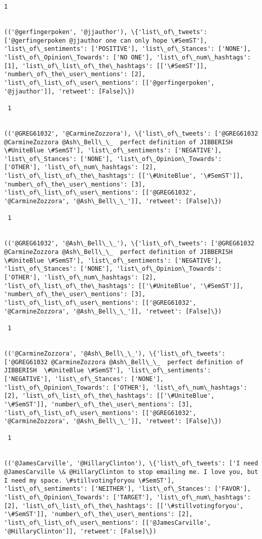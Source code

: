 \documentclass[11pt]{article}
\begin{document}
\begin{Verbatim}[commandchars=\\\{\}]
 1
 

(('@gerfingerpoken', '@jjauthor'), \{'list\_of\_tweets': ['@gerfingerpoken @jjauthor one can only hope \#SemST'], 'list\_of\_sentiments': ['POSITIVE'], 'list\_of\_Stances': ['NONE'], 'list\_of\_Opinion\_Towards': ['NO ONE'], 'list\_of\_num\_hashtags': [1], 'list\_of\_list\_of\_the\_hashtags': [['\#SemST']], 'number\_of\_the\_user\_mentions': [2], 'list\_of\_list\_of\_user\_mentions': [['@gerfingerpoken', '@jjauthor']], 'retweet': [False]\})

 1
 

(('@GREG61032', '@CarmineZozzora'), \{'list\_of\_tweets': ['@GREG61032 @CarmineZozzora @Ash\_Bell\_\_  perfect definition of JIBBERISH  \#UniteBlue \#SemST'], 'list\_of\_sentiments': ['NEGATIVE'], 'list\_of\_Stances': ['NONE'], 'list\_of\_Opinion\_Towards': ['OTHER'], 'list\_of\_num\_hashtags': [2], 'list\_of\_list\_of\_the\_hashtags': [['\#UniteBlue', '\#SemST']], 'number\_of\_the\_user\_mentions': [3], 'list\_of\_list\_of\_user\_mentions': [['@GREG61032', '@CarmineZozzora', '@Ash\_Bell\_\_']], 'retweet': [False]\})

 1
 

(('@GREG61032', '@Ash\_Bell\_\_'), \{'list\_of\_tweets': ['@GREG61032 @CarmineZozzora @Ash\_Bell\_\_  perfect definition of JIBBERISH  \#UniteBlue \#SemST'], 'list\_of\_sentiments': ['NEGATIVE'], 'list\_of\_Stances': ['NONE'], 'list\_of\_Opinion\_Towards': ['OTHER'], 'list\_of\_num\_hashtags': [2], 'list\_of\_list\_of\_the\_hashtags': [['\#UniteBlue', '\#SemST']], 'number\_of\_the\_user\_mentions': [3], 'list\_of\_list\_of\_user\_mentions': [['@GREG61032', '@CarmineZozzora', '@Ash\_Bell\_\_']], 'retweet': [False]\})

 1
 

(('@CarmineZozzora', '@Ash\_Bell\_\_'), \{'list\_of\_tweets': ['@GREG61032 @CarmineZozzora @Ash\_Bell\_\_  perfect definition of JIBBERISH  \#UniteBlue \#SemST'], 'list\_of\_sentiments': ['NEGATIVE'], 'list\_of\_Stances': ['NONE'], 'list\_of\_Opinion\_Towards': ['OTHER'], 'list\_of\_num\_hashtags': [2], 'list\_of\_list\_of\_the\_hashtags': [['\#UniteBlue', '\#SemST']], 'number\_of\_the\_user\_mentions': [3], 'list\_of\_list\_of\_user\_mentions': [['@GREG61032', '@CarmineZozzora', '@Ash\_Bell\_\_']], 'retweet': [False]\})

 1
 

(('@JamesCarville', '@HillaryClinton'), \{'list\_of\_tweets': ['I need @JamesCarville \& @HillaryClinton to stop emailing me. I love you, but I need my space. \#stillvotingforyou \#SemST'], 'list\_of\_sentiments': ['NEITHER'], 'list\_of\_Stances': ['FAVOR'], 'list\_of\_Opinion\_Towards': ['TARGET'], 'list\_of\_num\_hashtags': [2], 'list\_of\_list\_of\_the\_hashtags': [['\#stillvotingforyou', '\#SemST']], 'number\_of\_the\_user\_mentions': [2], 'list\_of\_list\_of\_user\_mentions': [['@JamesCarville', '@HillaryClinton']], 'retweet': [False]\})


\end{Verbatim}
\end{document}
